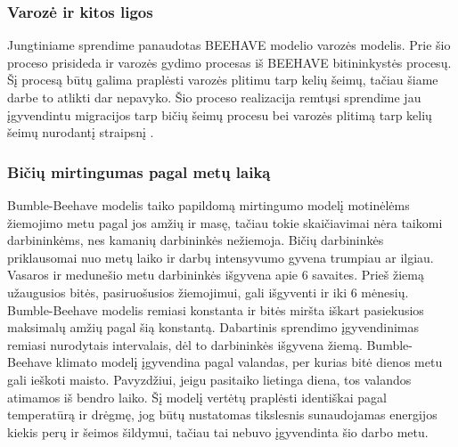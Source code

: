 \documentclass{VUMIFKompMagistrinis}
\begin{document}
\subsubsection{Varozė ir kitos ligos}
Jungtiniame sprendime panaudotas BEEHAVE modelio varozės modelis. Prie šio proceso prisideda ir varozės gydimo procesas iš BEEHAVE bitininkystės procesų. Šį procesą būtų galima praplėsti varozės plitimu tarp kelių šeimų, tačiau šiame darbe to atlikti dar nepavyko. Šio proceso realizacija remtųsi sprendime jau įgyvendintu migracijos tarp bičių šeimų procesu bei varozės plitimą tarp kelių šeimų nurodantį straipsnį \cite{NoD17}. 






\subsubsection{Bičių mirtingumas pagal metų laiką}
Bumble-Beehave modelis taiko papildomą mirtingumo modelį motinėlėms žiemojimo metu pagal jos amžių ir masę, tačiau tokie skaičiavimai nėra taikomi darbininkėms, nes kamanių darbininkės nežiemoja.
Bičių darbininkės priklausomai nuo metų laiko ir darbų intensyvumo gyvena trumpiau ar ilgiau. Vasaros ir medunešio metu darbininkės išgyvena apie 6 savaites. Prieš žiemą užaugusios bitės, pasiruošusios žiemojimui, gali išgyventi ir iki 6 mėnesių. Bumble-Beehave modelis remiasi konstanta ir bitės miršta iškart pasiekusios maksimalų amžių pagal šią konstantą. Dabartinis sprendimo įgyvendinimas remiasi nurodytais \cite{YYY19} intervalais, dėl to darbininkės išgyvena žiemą.
Bumble-Beehave klimato modelį įgyvendina pagal valandas, per kurias bitė dienos metu gali ieškoti maisto. Pavyzdžiui, jeigu pasitaiko lietinga diena, tos valandos atimamos iš bendro laiko. Šį modelį vertėtų praplėsti identiškai pagal temperatūrą ir drėgmę, jog būtų nustatomas tikslesnis sunaudojamas energijos kiekis perų ir šeimos šildymui, tačiau tai nebuvo įgyvendinta šio darbo metu.
\end{document}
